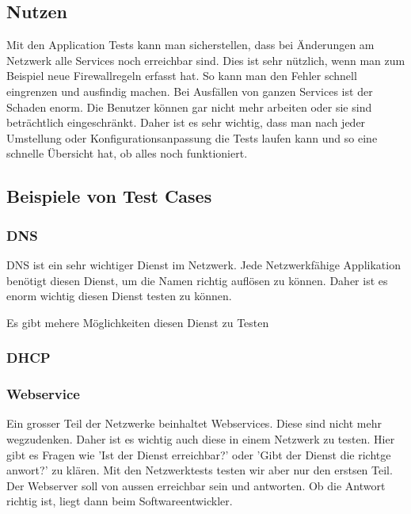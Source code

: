 \documentclass[a4,12pt]{scrartcl}
\begin{document}
\subsection{Nutzen}
Mit den Application Tests kann man sicherstellen, dass bei Änderungen am Netzwerk alle Services noch erreichbar sind. Dies ist sehr nützlich, wenn man zum Beispiel neue Firewallregeln erfasst hat. So kann man den Fehler schnell eingrenzen und ausfindig machen.\newline
Bei Ausfällen von ganzen Services ist der Schaden enorm. Die Benutzer können gar nicht mehr arbeiten oder sie sind beträchtlich eingeschränkt. Daher ist es sehr wichtig, dass man nach jeder Umstellung oder Konfigurationsanpassung die Tests laufen kann und so eine schnelle Übersicht hat, ob alles noch funktioniert.

\subsection{Beispiele von Test Cases}
\subsubsection{DNS}
DNS ist ein sehr wichtiger Dienst im Netzwerk. Jede Netzwerkfähige Applikation benötigt diesen Dienst, um die Namen richtig auflösen zu können. Daher ist es enorm wichtig diesen Dienst testen zu können.

Es gibt mehere Möglichkeiten diesen Dienst zu Testen 
\subsubsection{DHCP}

\subsubsection{Webservice}
Ein grosser Teil der Netzwerke beinhaltet Webservices. Diese sind nicht mehr wegzudenken. Daher ist es wichtig auch diese in einem Netzwerk zu testen. Hier gibt es Fragen wie 'Ist der Dienst erreichbar?' oder 'Gibt der Dienst die richtge anwort?' zu klären. Mit den Netzwerktests testen wir aber nur den erstsen Teil. Der Webserver soll von aussen erreichbar sein und antworten. Ob die Antwort richtig ist, liegt dann beim Softwareentwickler.\newline
\end{document}

